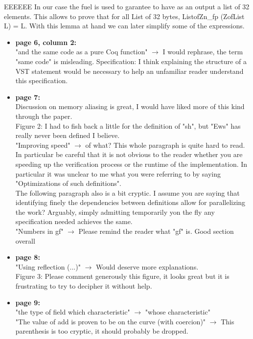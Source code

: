 \begin{answer}{EEEEEE}
    In our case the fuel is used to garantee to have as an output a list of 32 elements. This allows to prove that for all List of 32 bytes, ListofZn\_fp (ZofList L) = L. With this lemma at hand we can later simplify some of the expressions.
\end{answer}

\begin{itemize}
    \item \textbf{page 6, column 2:}\\
          "and the same code as a pure Coq function" $\rightarrow$ I would rephrase, the term "same code" is misleading.
          Specification: I think explaining the structure of a VST statement would be necessary to help an unfamiliar reader understand this specification.

    \item \textbf{page 7:}\\
          Discussion on memory aliasing is great, I would have liked more of this kind through the paper.\\
          Figure 2: I had to fish back a little for the definition of "sh", but "Ews" has really never been defined I believe.\\
          "Improving speed" $\rightarrow$ of what? This whole paragraph is quite hard to read. In particular be careful that it is not obvious to the reader whether you are speeding up the verification process or the runtime of the implementation. In particular it was unclear to me what you were referring to by saying "Optimizations of such definitions".\\
          The following paragraph also is a bit cryptic. I assume you are saying that identifying finely the dependencies between definitions allow for parallelizing the work? Arguably, simply admitting temporarily yon the fly any specification needed  achieves the same.\\
          "Numbers in gf" $\rightarrow$ Please remind the reader what "gf" is. Good section overall

    \item \textbf{page 8:}\\
          "Using reflection (...)" $\rightarrow$ Would deserve more explanations.\\
          Figure 3: Please comment generously this figure, it looks great but it is frustrating to try to decipher it without help.

    \item \textbf{page 9:}\\
          {\color{gray}"the type of field which characteristic" $\rightarrow$ "whose characteristic"\\
          "The value of add is proven to be on the curve (with coercion)" $\rightarrow$ This parenthesis is too cryptic, it should probably be dropped.}


\end{itemize}
